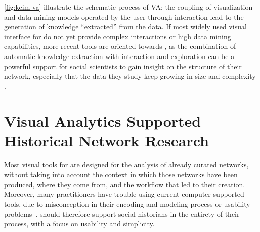 \autoref{fig:keim-va} illustrate the schematic process of VA: the coupling of visualization and data mining models operated by the user through interaction lead to the generation of knowledge ``extracted'' from the data.
If most widely used visual interface for \hsna do not yet provide complex interactions or high data mining capabilities, more recent tools are oriented towards \va, as the combination of automatic knowledge extraction with interaction and exploration can be a powerful support for social scientists to gain insight on the structure of their network, especially that the data they study keep growing in size and complexity \cite{kaplanVeniceTimeMachine2015}.





\section{Visual Analytics Supported Historical Network Research}\label{sec:intro-HSNV}

Most visual tools for \sna are designed for the analysis of already curated networks, without taking into account the context in which those networks have been produced, where they come from, and the workflow that led to their creation.
Moreover, many practitioners have trouble using current computer-supported tools, due to misconception in their encoding and modeling process or usability problems~\cite{alkadi2022}.
\va should therefore support social historians in the entirety of their process, with a focus on usability and simplicity.


